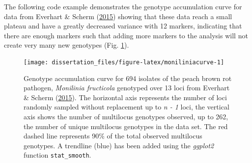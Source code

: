 \documentclass[double,11pt]{beavtex}
\begin{document}
  The following code example demonstrates the genotype accumulation curve
  for data from Everhart \& Scherm
  (\protect\hyperlink{ref-everhart2014fine}{2015}) showing that these data
  reach a small plateau and have a greatly decreased variance with 12
  markers, indicating that there are enough markers such that adding more
  markers to the analysis will not create very many new genotypes (Fig.
  \ref{fig:moniliniacurve}).
  
  \begin{Shaded}
  \begin{Highlighting}[]
  \NormalTok{(}\NormalTok{);}
  \NormalTok{(}\NormalTok{);}
  \NormalTok{(}\NormalTok{, } \NormalTok{);}
  
  \NormalTok{(}\NormalTok{);}
   \NormalTok{);}
  \StringTok{ }\NormalTok{() +}\StringTok{ }\NormalTok{();   }
  \StringTok{ }\NormalTok{(}\NormalTok{(} \NormalTok{)); }
  \end{Highlighting}
  \end{Shaded}
  
  \begin{figure}
  
  {\centering \texttt{[image: dissertation\_files/figure-latex/moniliniacurve-1]} 
  
  }
  
  \caption[Genotype accumulation curve]{Genotype accumulation curve for 694 isolates of the peach brown rot
  pathogen, \emph{Monilinia fructicola} genotyped over 13 loci from
  Everhart \& Scherm (\protect\hyperlink{ref-everhart2014fine}{2015}). The
  horizontal axis represents the number of loci randomly sampled without
  replacement up to \emph{n - 1} loci, the vertical axis shows the number
  of multilocus genotypes observed, up to 262, the number of unique
  multilocus genotypes in the data set. The red dashed line represents
  90\% of the total observed multilocus genotypes. A trendline (blue) has
  been added using the \emph{ggplot2} function \texttt{stat\_smooth}.}\label{fig:moniliniacurve}
  \end{figure}
  
\end{document}
